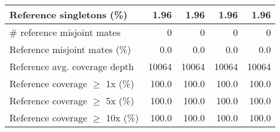 \documentclass[12pt,a4paper]{article}
\begin{document}
\begin{table}[ht]
\begin{center}
\begin{tabular}{|l*{4}{|r}|}
Reference singletons (\%) & 1.96 & 1.96 & 1.96 & 1.96 \\ \hline
\# reference misjoint mates & 0 & 0 & 0 & 0 \\ \hline
Reference misjoint mates (\%) & 0.0 & 0.0 & 0.0 & 0.0 \\ \hline
Reference avg. coverage depth & 10064 & 10064 & 10064 & 10064 \\ \hline
Reference coverage $\geq$ 1x (\%) & 100.0 & 100.0 & 100.0 & 100.0 \\ \hline
Reference coverage $\geq$ 5x (\%) & 100.0 & 100.0 & 100.0 & 100.0 \\ \hline
Reference coverage $\geq$ 10x (\%) & 100.0 & 100.0 & 100.0 & 100.0 \\ \hline
\end{tabular}
\end{center}
\end{table}
\end{document}
